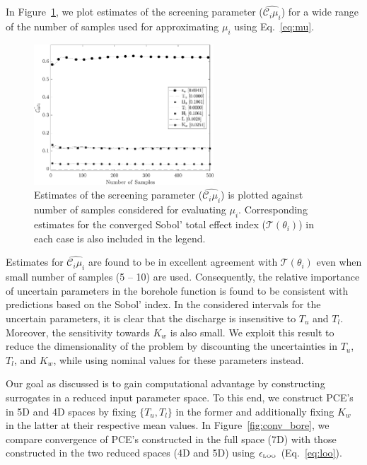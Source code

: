 In Figure~\ref{fig:screen_bore}, we plot estimates of the screening parameter ($\hat{\mathcal{C}_i\mu_i}$)
for a wide range of the number of samples used for approximating $\mu_i$ using Eq.~\ref{eq:mu}.

\begin{figure}[htbp]
 \begin{center}
  \includegraphics[width=0.6\textwidth]{./Figures/ub_conv_borehole}
\caption{Estimates of the screening parameter ($\hat{\mathcal{C}_i\mu_i}$) is plotted 
against number of samples considered for evaluating $\mu_i$. Corresponding estimates
for the converged Sobol' total effect index ($\mathcal{T}(\theta_i)$) in each case is also included in the
legend.}
\label{fig:screen_bore}
\end{center}
\end{figure}

\noindent Estimates for $\hat{\mathcal{C}_i\mu_i}$ are found to be in excellent agreement with $\mathcal{T}(\theta_i)$
even when small number of samples (5 -- 10) are used. 
Consequently, the relative importance of uncertain 
parameters in the borehole function is found to be consistent with predictions based on the Sobol' index. 
In the considered intervals for the uncertain parameters, it is clear that the discharge is insensitive to
$T_u$ and $T_l$. Moreover, the sensitivity towards $K_w$ is also small. We exploit this result to reduce
the dimensionality of the problem by 
discounting the uncertainties in $T_u$, $T_l$, and $K_w$, while using nominal values for these
parameters instead.  

Our goal as discussed is to gain computational advantage by constructing surrogates in a 
reduced input parameter space. To this end, we construct PCE's in 5D and 4D spaces by
fixing $\{T_u,T_l\}$ in the former and additionally fixing $K_w$ in the latter at their respective
mean values. In Figure~\ref{fig:conv_bore}, we compare convergence of PCE's constructed
in the full space (7D) with those constructed in the two reduced spaces (4D and 5D) using
$\epsilon_{\mbox{\tiny{LOO}}}$ (Eq.~\ref{eq:loo}). 

